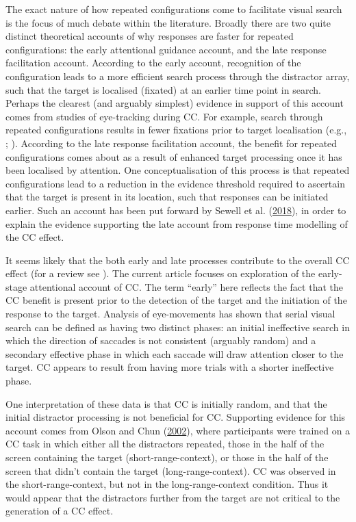 \documentclass[
  man,
  floatsintext,
  longtable,
  nolmodern,
  notxfonts,
  notimes,
  colorlinks=true,linkcolor=blue,citecolor=blue,urlcolor=blue]{apa7}
\begin{document}
The exact nature of how repeated configurations come to facilitate
visual search is the focus of much debate within the literature. Broadly
there are two quite distinct theoretical accounts of why responses are
faster for repeated configurations: the early attentional guidance
account, and the late response facilitation account. According to the
early account, recognition of the configuration leads to a more
efficient search process through the distractor array, such that the
target is localised (fixated) at an earlier time point in search.
Perhaps the clearest (and arguably simplest) evidence in support of this
account comes from studies of eye-tracking during CC. For example,
search through repeated configurations results in fewer fixations prior
to target localisation (e.g., ; ). According to the
late response facilitation account, the benefit for repeated
configurations comes about as a result of enhanced target processing
once it has been localised by attention. One conceptualisation of this
process is that repeated configurations lead to a reduction in the
evidence threshold required to ascertain that the target is present in
its location, such that responses can be initiated earlier. Such an
account has been put forward by Sewell et al.
(\hyperref[ref-sewell2018]{2018}), in order to explain the evidence
supporting the late account from response time modelling of the CC
effect.

It seems likely that the both early and late processes contribute to the
overall CC effect (for a review see ). The current article focuses on exploration of the early-stage
attentional account of CC. The term ``early'' here reflects the fact
that the CC benefit is present prior to the detection of the target and
the initiation of the response to the target. Analysis of eye-movements
has shown that serial visual search can be defined as having two
distinct phases: an initial ineffective search in which the direction of
saccades is not consistent (arguably random) and a secondary effective
phase in which each saccade will draw attention closer to the target. CC
appears to result from having more trials with a shorter ineffective
phase.

One interpretation of these data is that CC is initially random, and
that the initial distractor processing is not beneficial for CC.
Supporting evidence for this account comes from Olson and Chun
(\hyperref[ref-olson2002]{2002}), where participants were trained on a
CC task in which either all the distractors repeated, those in the half
of the screen containing the target (short-range-context), or those in
the half of the screen that didn't contain the target
(long-range-context). CC was observed in the short-range-context, but
not in the long-range-context condition. Thus it would appear that the
distractors further from the target are not critical to the generation
of a CC effect.
\end{document}
